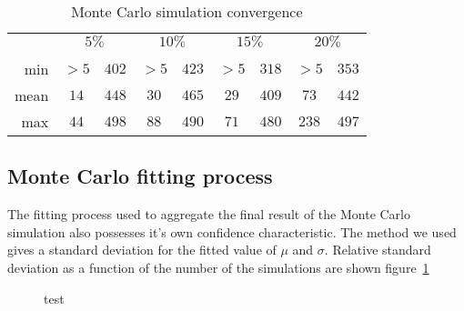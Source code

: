 \documentclass[10pt,conference,compsocconf]{IEEEtran}
\newcommand*\rot{\rotatebox{90}}
\begin{document}
\begin{table}
	\centering
	\begin{tabular}{rcc|cc|cc|cc}
		\cline{2-9}
		& \multicolumn{2}{c|}{$5\%$}& \multicolumn{2}{c|}{$10\%$}&
		\multicolumn{2}{c|}{$15\%$}& \multicolumn{2}{c}{$20\%$}\\
		&\rot{$\mu.ae<.5\%$}&\rot{$\sigma.ae<1\%$}&\rot{$\mu.ae<.5\%$}&\rot{$\sigma.ae<1\%$}&\rot{$\mu.ae<.5\%$}&\rot{$\sigma.ae<1\%$}&\rot{$\mu.ae<.5\%$}&\rot{$\sigma.ae<1\%$}\\
		\hline
		min&$>5$&$402$&$>5$&$423$&$>5$&$318$&$>5$&$353$\\
		mean&$14$&$448$&$30$&$465$&$29$&$409$&$73$&$442$\\
		max&$44$&$498$&$88$&$490$&$71$&$480$&$238$&$497$\\
		\hline
	\end{tabular}
	\caption{Monte Carlo simulation convergence}
	\label{tab:mcs-convergence}
\end{table}

\subsection{Monte Carlo fitting process}

The fitting process used to aggregate the final result of the Monte Carlo
simulation also possesses it's own confidence characteristic. The method we used
gives a standard deviation for the fitted value of $\mu$ and $\sigma$. Relative
standard deviation as a function of the number of the simulations are shown
figure~\ref{fig:confidence}

\begin{figure}
	\centering
	
	\caption{test}
	\label{fig:confidence}
\end{figure}







\end{document}
